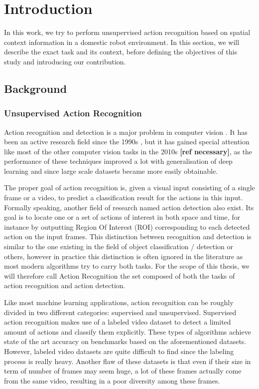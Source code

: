 \chapter{Introduction}

In this work, we try to perform unsupervised action recognition based on spatial context information in a domestic robot environment. In this section, we will describe the exact task and its context, before defining the objectives of this study and introducing our contribution.

\section{Background}
\subsection{Unsupervised Action Recognition}
Action recognition and detection is a major problem in computer vision \cite{review_action_recognition}. It has been an active research field since the 1990s \cite{plan_recognition}, but it has gained special attention like most of the other computer vision tasks in the 2010s \textbf{[ref necessary]}, as the performance of these techniques improved a lot with generalisation of deep learning and since large scale datasets became more easily obtainable.

The proper goal of action recognition is, given a visual input consisting of a single frame or a video, to predict a classification result for the actions in this input. Formally speaking, another field of research named action detection also exist. Its goal is to locate one or a set of actions of interest in both space and time, for instance by outputting Region Of Interest (ROI) corresponding to each detected action on the input frames.
This distinction between recognition and detection is similar to the one existing in the field of object classification / detection or others, however in practice this distinction is often ignored in the literature as most modern algorithms try to carry both tasks. For the scope of this thesis, we will therefore call Action Recognition the set composed of both the tasks of action recognition and action detection.
\vspace{12pt}

Like most machine learning applications, action recognition can be roughly divided in two different categories: supervised and unsupervised. Supervised action recognition makes use of a labeled video dataset \cite{hollywood2,sports_video_dataset,ActivityNet} to detect a limited amount of actions and classify them explicitly. These types of algorithms achieve state of the art accuracy on benchmarks based on the aforementioned datasets. However, labeled video datasets are quite difficult to find since the labeling process is really heavy. Another flaw of these datasets is that even if their size in term of number of frames may seem huge, a lot of these frames actually come from the same video, resulting in a poor diversity among these frames.

